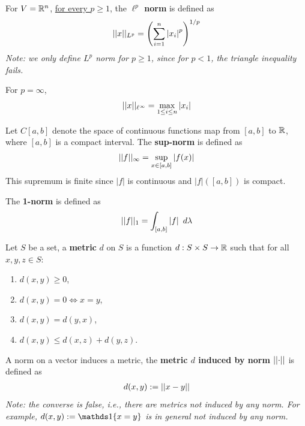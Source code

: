 \documentclass[11pt]{article}
\begin{document}
	\begin{example}
		For $V = \mathbb{R}^n$, \ul{for every $p \geq 1$}, the \textbf{$\ell^p$ norm} is defined as
		\begin{align}
			\vert \vert {x} \vert \vert_{L^p} = \left( \sum_{i=1}^n \left \vert {x_i} \right \vert^p \right)^{1/p}
		\end{align}
		\emph{Note: we only define $L^p$ norm for $p \geq 1$, since for $p < 1$, the triangle inequality fails.}

		For $p = \infty$,
		\begin{align}
			\vert \vert {x} \vert \vert_{\ell^\infty} = \max_{1 \leq i \leq n} |x_i|
		\end{align}
	\end{example}
	
	\begin{example}
		Let $C[a, b]$ denote the space of continuous functions map from $[a, b]$ to $\mathbb{R}$, where $[a, b]$ is a compact interval.
		The \textbf{sup-norm} is defined as
		\begin{align}
			\vert \vert {f} \vert \vert_\infty = \sup_{x \in [a, b]} \left \vert {f(x)} \right \vert
		\end{align}
		This supremum is finite since $|f|$ is continuous and $|f|([a,b])$ is compact.
		
		The \textbf{1-norm} is defined as
		\begin{align}
			\vert \vert {f} \vert \vert_1 = \int_{[a, b]} \left \vert {f} \right \vert\ d\lambda
		\end{align}
	\end{example}
	
	\begin{definition}
		Let $S$ be a set, a \textbf{metric} $d$ on $S$ is a function $d: S \times S \to \mathbb{R}$ such that for all $x, y, z \in S$:
		\begin{enumerate}
			\item $d(x, y) \geq 0$,
			\item $d(x, y) = 0 \iff x = y$,
			\item $d(x, y) = d(y, x)$,
			\item $d(x, y) \leq d(x, z) + d(y, z)$.
		\end{enumerate}
	\end{definition}
	
	\begin{definition}
		A norm on a vector induces a metric, the \textbf{metric $d$ induced by norm $\vert \vert {\cdot} \vert \vert$} is defined as
		\begin{align}
			d(x, y) := \vert \vert {x - y} \vert \vert
		\end{align}
		\emph{Note: the converse is false, i.e., there are metrics not induced by any norm. For example, $d(x, y) := \id{x = y}$ is in general not induced by any norm.}
	\end{definition}
	
\end{document}
